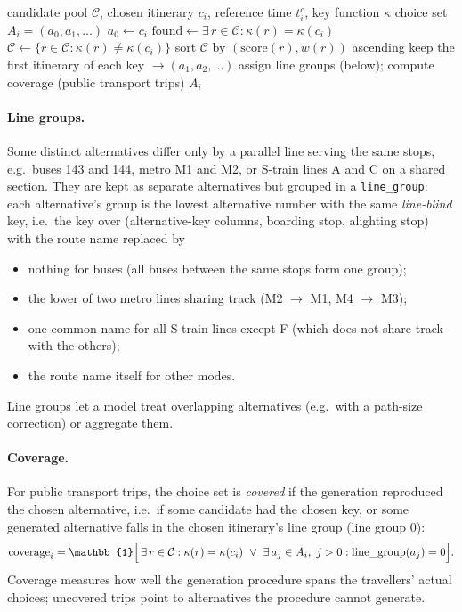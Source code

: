 \documentclass[11pt,a4paper]{article}
\newcommand{\code}[1]{\texttt{#1}}
\newcommand{\cand}{\mathcal{C}}
\newcommand{\key}{\kappa}
\begin{document}
\begin{algorithm}[htbp]
\caption{Building the choice set of trip $i$}
\label{alg:collapse}
\begin{algorithmic}[1]
\Require candidate pool $\cand$, chosen itinerary $c_i$, reference time $t^{c}_i$, key function $\key$
\Ensure choice set $A_i = (a_0, a_1, \dots)$
\State $a_0 \gets c_i$
  \State $\text{found} \gets \exists\, r \in \cand : \key(r) = \key(c_i)$
  \State $\cand \gets \{ r \in \cand : \key(r) \neq \key(c_i) \}$
\EndIf
\State sort $\cand$ by $(\text{score}(r), w(r))$ ascending
\State keep the first itinerary of each key $\to (a_1, a_2, \dots)$
\State assign line groups (below); compute coverage (public transport trips)
\State \Return $A_i$
\end{algorithmic}
\end{algorithm}

\paragraph{Line groups.} Some distinct alternatives differ only by a parallel line serving the same
stops, e.g.\ buses 143 and 144, metro M1 and M2, or S-train lines A and C on a shared section. They are
kept as separate alternatives but grouped in a \code{line\_group}: each alternative's group is the
lowest alternative number with the same \emph{line-blind} key, i.e.\ the key over (alternative-key
columns, boarding stop, alighting stop) with the route name replaced by
\begin{itemize}
  \item nothing for buses (all buses between the same stops form one group);
  \item the lower of two metro lines sharing track (M2 $\to$ M1, M4 $\to$ M3);
  \item one common name for all S-train lines except F (which does not share track with the others);
  \item the route name itself for other modes.
\end{itemize}
Line groups let a model treat overlapping alternatives (e.g.\ with a path-size correction) or
aggregate them.

\paragraph{Coverage.} For public transport trips, the choice set is \emph{covered} if the generation
reproduced the chosen alternative, i.e.\ if some candidate had the chosen key, or some generated
alternative falls in the chosen itinerary's line group (line group $0$):
\begin{equation}
  \text{coverage}_i = \mathbb{1}\Bigl[\, \exists\, r \in \cand : \key(r) = \key(c_i)
  \ \lor\ \exists\, a_j \in A_i,\ j>0 : \text{line\_group}(a_j) = 0 \Bigr].
\end{equation}
Coverage measures how well the generation procedure spans the travellers' actual choices; uncovered
trips point to alternatives the procedure cannot generate.
\end{document}
